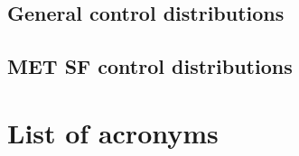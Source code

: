 \documentclass[11pt]{article}
\begin{document}
\subsection{General control distributions}
\label{sec:orgdc7742d}
\subsection{MET SF control distributions}
\label{sec:orgdc437cb}
\section{List of acronyms}
\label{sec:orgaf6f7c1}



\end{document}
